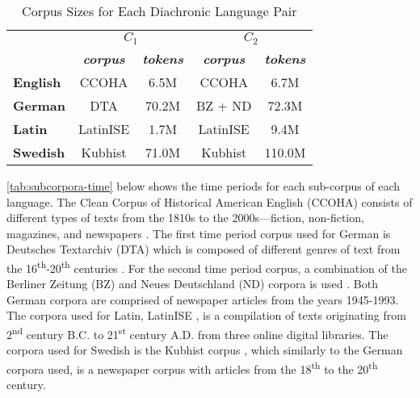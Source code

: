 \begin{table}[h]
\centering
\begin{tabular}{lcccc} 
\toprule
\textbf{}        & \multicolumn{2}{c}{\textbf{$C_1$}}                  & \multicolumn{2}{c}{\textbf{$C_2$}}                   \\
                 & \textit{\textbf{corpus}} & \textit{\textbf{tokens}} & \textit{\textbf{corpus}} & \textit{\textbf{tokens}}  \\ 
\cline{2-5}
\textbf{English} & CCOHA                    & 6.5M                     & CCOHA                    & 6.7M                      \\
\textbf{German}  & DTA                      & 70.2M                    & BZ + ND                  & 72.3M                     \\
\textbf{Latin}   & LatinISE                 & 1.7M                     & LatinISE                 & 9.4M                      \\
\textbf{Swedish} & Kubhist                  & 71.0M                    & Kubhist                  & 110.0M                    \\
\bottomrule
\end{tabular}
\caption{Corpus Sizes for Each Diachronic Language Pair}
\label{tab:subcorpora-size}
\end{table}

\autoref{tab:subcorpora-time} below shows the time periods for each sub-corpus of each language. The Clean Corpus of Historical American English (CCOHA) consists of different types of texts from the 1810s to the 2000s—fiction, non-fiction, magazines, and newspapers \citep{davies2012expanding, alatrash-etal-2020-ccoha}. The first time period corpus used for German is Deutsches Textarchiv (DTA) which is composed of different genres of text from the 16\textsuperscript{th}-20\textsuperscript{th} centuries \citep{dta2017}. For the second time period corpus, a combination of the Berliner Zeitung (BZ) and Neues Deutschland (ND) corpora is used \citep{berliner2018,neues2018}. Both German corpora are comprised of newspaper articles from the years 1945-1993. The corpora used for Latin, LatinISE \citep{mcgillivray-kilgarriff}, is a compilation of texts originating from 2\textsuperscript{nd} century B.C. to 21\textsuperscript{st} century A.D. from three online digital libraries. The corpora used for Swedish is the Kubhist corpus \citep{Kubhist}, which similarly to the German corpora used, is a newspaper corpus with articles from the 18\textsuperscript{th} to the 20\textsuperscript{th} century. \hfill \break


